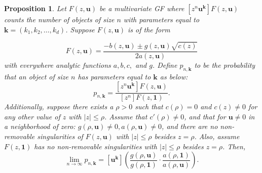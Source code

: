 \documentclass{article}
\newtheorem{proposition}[theorem]{Proposition}
\begin{document}
\begin{proposition} \label{prop:GF}
Let $F(z, \mathbf{u})$ be a multivariate GF where $[z^n\mathbf{u}^\mathbf{k}]F(z, \mathbf{u})$ counts the number of objects of size $n$ with parameters equal to $\mathbf{k} = (k_1, k_2, \ldots, k_d)$.  Suppose $F(z, \mathbf{u})$ is of the form
   
    \[
    F(z, \mathbf{u}) = \frac{-b(z, \mathbf{u}) \pm g(z, \mathbf{u}) \sqrt{c(z)}}{2a(z, \mathbf{u})}
    \]
    with everywhere analytic functions $a, b, c,$ and $g$. Define $p_{n, \mathbf{k}}$ to be the probability that an object of size $n$ has parameters equal to $\mathbf{k}$ as below:
    \[
    p_{n, \mathbf{k}} = \frac{[z^n\mathbf{u}^\mathbf{k}] F(z, \mathbf{u})}{[z^n]F(z, \mathbf{1})}.
    \]
    Additionally, suppose there exists a $\rho > 0$ such that $c(\rho) = 0$ and $c(z) \neq 0$ for any other value of $z$ with $|z| \leq \rho$.  Assume that $c'(\rho) \neq 0$, and that for $\mathbf{u} \neq 0$ in a neighborhood of zero: $g(\rho, \mathbf{u}) \neq 0, a(\rho, \mathbf{u}) \neq 0$, and there are no non-removable singularities of $F(z, \mathbf{u})$ with $|z| \leq \rho$ besides $z = \rho$.  Also, assume $F(z, \mathbf{1})$ has no non-removable singularities with $|z| \leq \rho$ besides $z = \rho$. Then,
    \[
    \lim_{n \to \infty} p_{n, \mathbf{k}} = [\mathbf{u}^\mathbf{k}] \left(\frac{g(\rho, \mathbf{u})}{g(\rho, \mathbf{1})} \cdot \frac{a(\rho, \mathbf{1})}{a(\rho, \mathbf{u})}\right).
    \]
\end{proposition}
\end{document}
